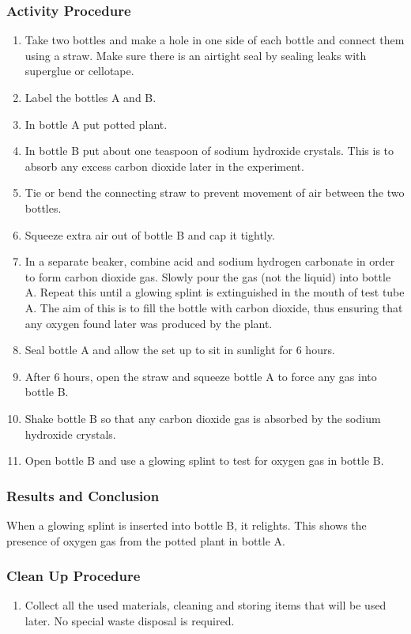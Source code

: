 \subsubsection*{Activity Procedure}
\begin{enumerate}
\item{Take two bottles and make a hole in one side of each bottle and connect them using a straw. Make sure there is an airtight seal by sealing leaks with superglue or cellotape.}
\item{Label the bottles A and B.}
\item{In bottle A put potted plant.}
\item{In bottle B put about one teaspoon of sodium hydroxide crystals. This is to absorb any excess carbon dioxide later in the experiment.}
\item{Tie or bend the connecting straw to prevent movement of air between the two bottles.}
\item{Squeeze extra air out of bottle B and cap it tightly.}
\item{In a separate beaker, combine acid and sodium hydrogen carbonate in order to form carbon dioxide gas. Slowly pour the gas (not the liquid) into bottle A. Repeat this until a glowing splint is extinguished in the mouth of test tube A. The aim of this is to fill the bottle with carbon dioxide, thus ensuring that any oxygen found later was produced by the plant.}
\item{Seal bottle A and allow the set up to sit in sunlight for 6 hours.}
\item{After 6 hours, open the straw and squeeze bottle A to force any gas into bottle B.}
\item{Shake bottle B so that any carbon dioxide gas is absorbed by the sodium hydroxide crystals.}
\item{Open bottle B and use a glowing splint to test for oxygen gas in bottle B.}
\end{enumerate}

\subsubsection*{Results and Conclusion}
When a glowing splint is inserted into bottle B, it relights. This shows the presence of oxygen gas from the potted plant in bottle A.

\subsubsection*{Clean Up Procedure}
\begin{enumerate}
\item{Collect all the used materials, cleaning and storing items that will be used later. No special waste disposal is required.}
\end{enumerate}

